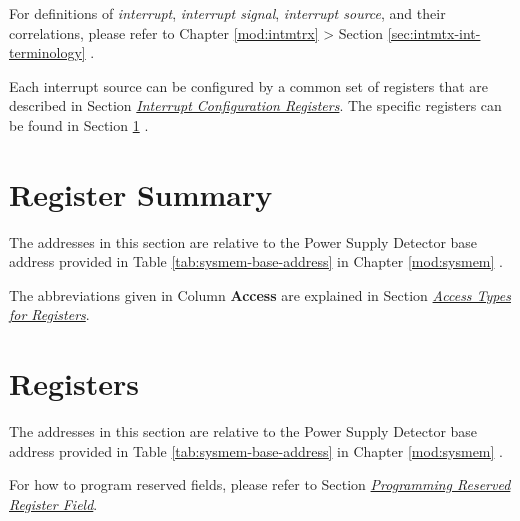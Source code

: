 \documentclass[main\_\_EN.tex]{subfiles}
\begin{document}
\begin{tiplisting}
For definitions of \textit{interrupt}, \textit{interrupt signal}, \textit{interrupt source}, and their correlations, please refer to Chapter \ref{mod:intmtrx} \textit{} > Section \ref{sec:intmtx-int-terminology} \textit{}.
\end{tiplisting}

Each interrupt source can be configured by a common set of registers that are described in Section \hyperref[interrupt-config-registers]{\textit{Interrupt Configuration Registers}}. The specific registers can be found in Section \ref{sec:psdet-reg-summ} \textit{}.



\newpage
\hypertarget{psdet-reg-summ}{}
\section{Register Summary}
\label{sec:psdet-reg-summ}

The addresses in this section are relative to the Power Supply Detector base address provided in Table \ref{tab:sysmem-base-address} in Chapter \ref{mod:sysmem} \textit{}.

The abbreviations given in Column \textbf{Access} are explained in Section \hyperref[glossary-access-types]{\textit{Access Types for Registers}}.






\newpage
\section{Registers}

The addresses in this section are relative to the Power Supply Detector base address provided in Table \ref{tab:sysmem-base-address} in Chapter \ref{mod:sysmem} \textit{}.

For how to program reserved fields, please refer to Section \hyperref[programming-reserved-field]{\textit{Programming Reserved Register Field}}.


\end{document}
